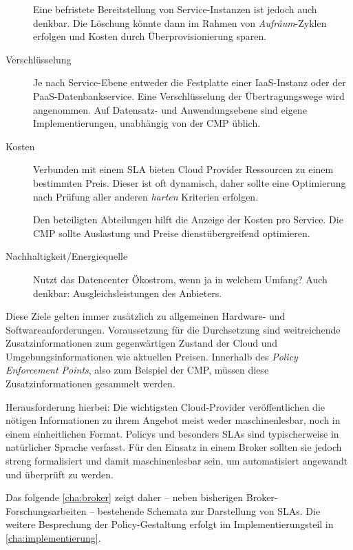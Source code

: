 \begin{description}
	Eine befristete Bereitstellung von Service-Instanzen ist jedoch auch denkbar. Die Löschung könnte dann im Rahmen von \emph{Aufräum}-Zyklen erfolgen und Kosten durch Überprovisionierung sparen.
	
	\item[Verschlüsselung] Je nach Service-Ebene entweder die Festplatte einer IaaS-Instanz oder der PaaS-Datenbankservice. Eine Verschlüsselung der Übertragungswege wird angenommen. Auf Datensatz- und Anwendungsebene sind eigene Implementierungen, unabhängig von der CMP üblich.
	
	\item[Kosten] Verbunden mit einem SLA bieten Cloud Provider Ressourcen zu einem bestimmten Preis. Dieser ist oft dynamisch, daher sollte eine Optimierung nach Prüfung aller anderen \emph{harten} Kriterien erfolgen.
	
	Den beteiligten Abteilungen hilft die Anzeige der Kosten pro Service. Die CMP sollte Auslastung und Preise dienstübergreifend optimieren.
	 	
	\item[Nachhaltigkeit/Energiequelle] Nutzt das Datencenter Ökostrom, wenn ja in welchem Umfang? Auch denkbar: Ausgleichsleistungen des Anbieters.
	
	
\end{description}

\noindent 
Diese Ziele gelten immer zusätzlich zu allgemeinen Hardware- und Softwareanforderungen. Voraussetzung für die Durchsetzung sind weitreichende Zusatzinformationen zum gegenwärtigen Zustand der Cloud und Umgebungsinformationen wie aktuellen Preisen. Innerhalb des \emph{Policy Enforcement Points}, also zum Beispiel der CMP, müssen diese Zusatzinformationen gesammelt werden.

Herausforderung hierbei: Die wichtigsten Cloud-Provider veröffentlichen die nötigen Informationen zu ihrem Angebot meist weder maschinenlesbar, noch in einem einheitlichen Format.
Policys und besonders SLAs sind typischerweise in natürlicher Sprache verfasst. Für den Einsatz in einem Broker sollten sie jedoch streng formalisiert und damit maschinenlesbar sein, um automatisiert angewandt und überprüft zu werden.

Das folgende \autoref{cha:broker} zeigt daher -- neben bisherigen Broker-Forschungsarbeiten -- bestehende Schemata zur Darstellung von SLAs. Die weitere Besprechung der Policy-Gestaltung erfolgt im Implementierungsteil in \autoref{cha:implementierung}.